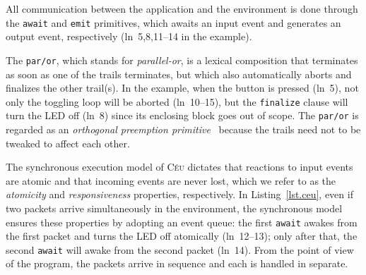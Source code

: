 \documentclass[sigplan,10pt,review,anonymous]{acmart}\settopmatter{printfolios=true,printccs=false,printacmref=false}
\newcommand{\CEU}{\textsc{C\'{e}u}\xspace}
\newcommand{\code}[1] {{\small{\texttt{#1}}}}
\begin{document}
All communication between the application and the environment is done through
the \code{await} and \code{emit} primitives, which awaits an input event and
generates an output event, respectively (ln~5,8,11--14 in the example).

The \code{par/or}, which stands for \emph{parallel-or}, is a lexical
composition that terminates as soon as one of the trails terminates, but which
also automatically aborts and finalizes the other trail(s).
%
In the example, when the button is pressed (ln~5), not only the toggling loop
will be aborted (ln~10--15), but the \code{finalize} clause will turn the LED
off (ln~8) since its enclosing block goes out of scope.
%
The \code{par/or} is regarded as an \emph{orthogonal preemption
primitive}~\cite{esterel.preemption} because the trails need not to be tweaked
to affect each other.


The synchronous execution model of \CEU dictates that reactions to input events
are atomic and that incoming events are never lost, which we refer to as the
\emph{atomicity} and \emph{responsiveness} properties, respectively.
%
%
In Listing~\ref{lst.ceu}, even if two packets arrive simultaneously in the
environment, the synchronous model ensures these properties by adopting an
event queue:
    the first \code{await} awakes from the first packet and turns the LED off
    atomically (ln~12--13);
    only after that, the second \code{await} will awake from the second packet
    (ln~14).
From the point of view of the program, the packets arrive in sequence and each
is handled in separate.
%
\end{document}
